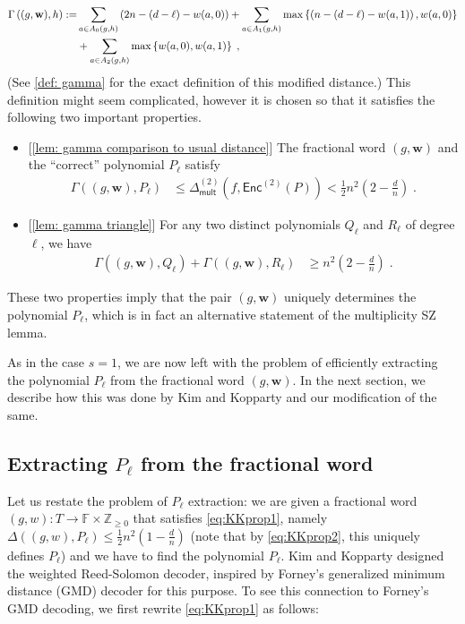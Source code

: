 \documentclass{article}
\def\Integer{\mathbb{Z}}
\def\Field{\mathbb{F}}
\let\Z\Integer
\let\F\Field
\def\vecw{\mathbf{w}}
\newcommand{\enc}{{\mathsf{Enc}}}
\newcommand{\vw}{\vecw}
\begin{document}
	\begin{align}
		\Gamma\left((g,\vw),h\right) := &\sum_{a \in
				A_0(g,h)}\left(2n - (d-\ell) - w(a,0)\right) + \sum_{a \in A_1(g,h)}
		\max\left\{\left( n- (d-\ell) - w(a,1) \right), w(a,0)\right\}\notag\\
		& + \sum_{a \in A_2(g,h)}\max\left\{w(a,0), w(a,1)\right\} \;,\label{eq:ourdistance}
	\end{align}
	(See \cref{def: gamma} for the exact definition of this modified
	distance.) This definition might seem complicated, however it is chosen
	so that it satisfies the following
	two important properties.
	\begin{itemize}
		\item {[\cref{lem: gamma comparison to usual distance}]} The fractional word $(g,\vw)$ and the ``correct'' polynomial
		$P_\ell$ satisfy
		\begin{align}\Gamma((g,\vw),P_\ell) &\leq \Delta_{\mathsf{mult}}^{(2)}(f,\enc^{(2)}(P)) < \frac12
			n^2\left(2-\frac{d}{n}\right)\;.\label{eq:prop1}
		\end{align}
		\item {[\cref{lem: gamma triangle}]} For any two distinct polynomials $Q_\ell$ and $R_\ell$ of
		degree $\ell$, we have
		\begin{align}
			\Gamma((g,\vw), Q_\ell) +
			\Gamma((g,\vw),R_\ell) & \geq n^2\left(2
			-\frac{d}{n}\right)\;. \label{eq:prop2}
		\end{align}
	\end{itemize}
	These two properties imply that the pair $(g,\vw)$ uniquely determines
	the polynomial $P_\ell$, which is in fact an alternative statement of the multiplicity SZ lemma.
	
	As in the case $s=1$, we are now left with the problem of efficiently extracting
	the polynomial $P_\ell$ from the fractional word
	$(g,\vw)$. In the next section, we describe how this was done
	by Kim and Kopparty and our modification of the same.
	
	\subsection{Extracting \texorpdfstring{$P_\ell$}{P l} from the fractional word}
	
	Let us restate the problem of $P_\ell$ extraction: we are given a
	fractional word $(g,w)\colon T \to \F \times \Z_{\geq 0}$ that
	satisfies \eqref{eq:KKprop1}, namely $\Delta((g,w), P_\ell) \leq \frac12
	n^2\left(1-\frac{d}{n}\right)$ (note that by \eqref{eq:KKprop2}, this
	uniquely defines $P_\ell$) and we have to find the polynomial
	$P_\ell$. Kim and Kopparty designed the weighted Reed-Solomon decoder,
	inspired by Forney's generalized minimum distance (GMD)  decoder for
	this purpose. To see this connection to Forney's GMD decoding, we
	first rewrite \eqref{eq:KKprop1} as follows:
	
\end{document}
